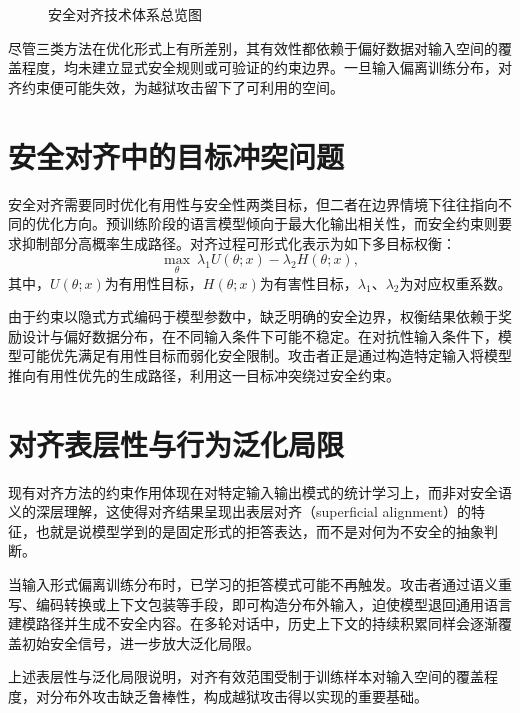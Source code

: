 \begin{figure}[H]
\centering
\resizebox{0.98\textwidth}{!}{}
\caption{安全对齐技术体系总览图}
\label{fig:safety-alignment-overview}
\end{figure}

尽管三类方法在优化形式上有所差别，其有效性都依赖于偏好数据对输入空间的覆盖程度，均未建立显式安全规则或可验证的约束边界。一旦输入偏离训练分布，对齐约束便可能失效，为越狱攻击留下了可利用的空间。

\section{安全对齐中的目标冲突问题}

安全对齐需要同时优化有用性与安全性两类目标，但二者在边界情境下往往指向不同的优化方向。预训练阶段的语言模型倾向于最大化输出相关性，而安全约束则要求抑制部分高概率生成路径。对齐过程可形式化表示为如下多目标权衡：
\begin{equation}
\max_{\theta} \ \lambda_1 U(\theta; x)-\lambda_2 H(\theta; x),
\end{equation}
其中，$U(\theta; x)$为有用性目标，$H(\theta; x)$为有害性目标，$\lambda_1$、$\lambda_2$为对应权重系数。

由于约束以隐式方式编码于模型参数中，缺乏明确的安全边界，权衡结果依赖于奖励设计与偏好数据分布，在不同输入条件下可能不稳定\cite{rafailov2023dpo}。在对抗性输入条件下，模型可能优先满足有用性目标而弱化安全限制。攻击者正是通过构造特定输入将模型推向有用性优先的生成路径，利用这一目标冲突绕过安全约束。

\section{对齐表层性与行为泛化局限}

现有对齐方法的约束作用体现在对特定输入输出模式的统计学习上，而非对安全语义的深层理解，这使得对齐结果呈现出表层对齐（superficial alignment）的特征，也就是说模型学到的是固定形式的拒答表达，而不是对何为不安全的抽象判断。

当输入形式偏离训练分布时，已学习的拒答模式可能不再触发。攻击者通过语义重写、编码转换或上下文包装等手段，即可构造分布外输入，迫使模型退回通用语言建模路径并生成不安全内容\cite{jiang2024artprompt,zeng2024johnny}\cite{wei2023jailbroken,chao2024pair}。在多轮对话中，历史上下文的持续积累同样会逐渐覆盖初始安全信号，进一步放大泛化局限\cite{chao2024pair}。

上述表层性与泛化局限说明，对齐有效范围受制于训练样本对输入空间的覆盖程度，对分布外攻击缺乏鲁棒性，构成越狱攻击得以实现的重要基础。

